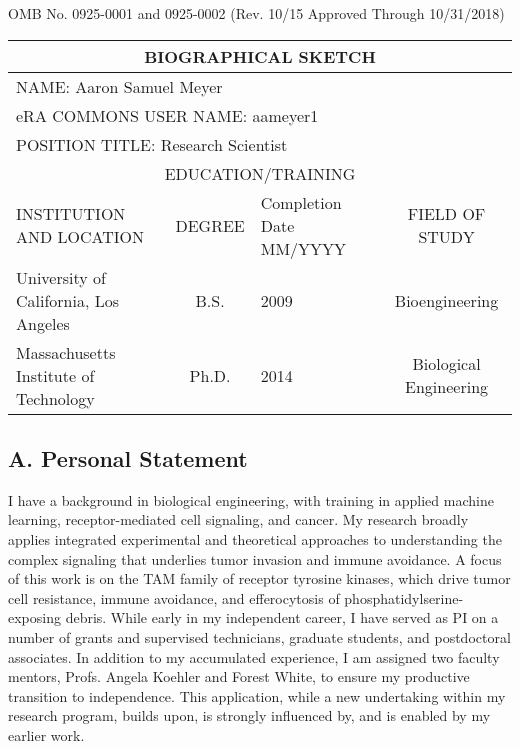 \documentclass[12pt]{article}
\begin{document}
\setlength\parindent{0pt}

\renewcommand{\arraystretch}{1.2}

\begin{flushright}
\footnotesize
	OMB No. 0925-0001 and 0925-0002 (Rev. 10/15 Approved Through 10/31/2018)
\end{flushright}

\begin{tabular}{l|c|p{1.2in}|c}
  \hline
  \multicolumn{4}{c}{\textbf{BIOGRAPHICAL SKETCH}} \\
  \hline
  \multicolumn{4}{l}{NAME: Aaron Samuel Meyer} \\
  \hline
  \multicolumn{4}{l}{eRA COMMONS USER NAME: aameyer1} \\
  \hline
  \multicolumn{4}{l}{POSITION TITLE: Research Scientist} \\
  \hline
  \multicolumn{4}{c}{EDUCATION/TRAINING} \\
  \hline
  INSTITUTION AND LOCATION & DEGREE & Completion Date MM/YYYY & FIELD OF STUDY \\
  \hline
  University of California, Los Angeles & B.S. & 2009 & Bioengineering \\
  Massachusetts Institute of Technology & Ph.D. & 2014 & Biological Engineering \\
  
\end{tabular}


\vspace{20pt}

\subsection{A. Personal Statement}


I have a background in biological engineering, with training in applied machine learning, receptor-mediated cell signaling, and cancer. My research broadly applies integrated experimental and theoretical approaches to understanding the complex signaling that underlies tumor invasion and immune avoidance. A focus of this work is on the TAM family of receptor tyrosine kinases, which drive tumor cell resistance, immune avoidance, and efferocytosis of phosphatidylserine-exposing debris. While early in my independent career, I have served as PI on a number of grants and supervised technicians, graduate students, and postdoctoral associates. In addition to my accumulated experience, I am assigned two faculty mentors, Profs. Angela Koehler and Forest White, to ensure my productive transition to independence. This application, while a new undertaking within my research program, builds upon, is strongly influenced by, and is enabled by my earlier work.
\end{document}
